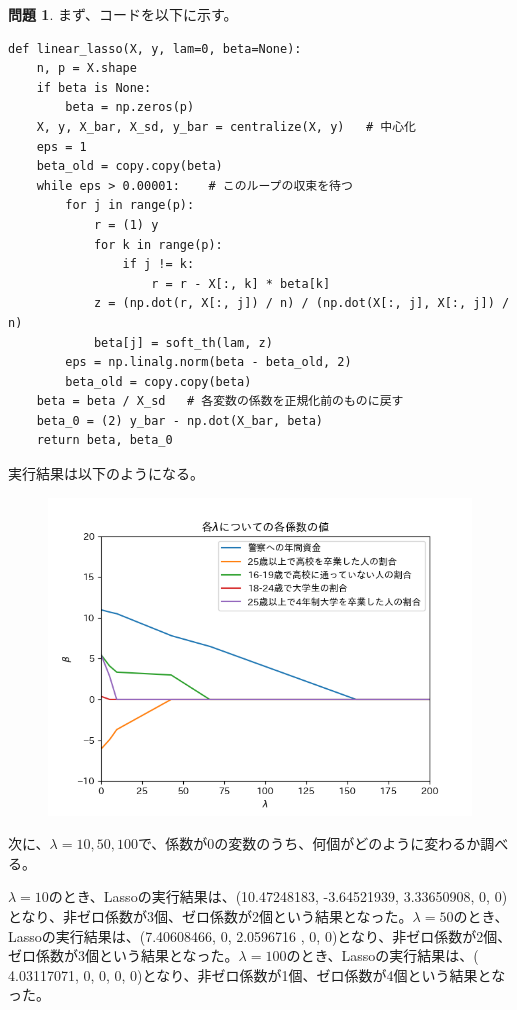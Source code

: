 \documentclass[titlepage]{jsarticle}
\theoremstyle{definition}
\newtheorem{Ex}{問題}
\theoremstyle{mystyle} %
\renewcommand{\footnotesize}{\normalsize}
\begin{document}
\begin{Ex}
まず、コードを以下に示す。
\begin{lstlisting}[basicstyle = \ttfamily\footnotesize, frame = single]
def linear_lasso(X, y, lam=0, beta=None):
    n, p = X.shape
    if beta is None:
        beta = np.zeros(p)
    X, y, X_bar, X_sd, y_bar = centralize(X, y)   # 中心化
    eps = 1
    beta_old = copy.copy(beta)
    while eps > 0.00001:    # このループの収束を待つ
        for j in range(p):
            r = (1) y
            for k in range(p):
                if j != k:
                    r = r - X[:, k] * beta[k]
            z = (np.dot(r, X[:, j]) / n) / (np.dot(X[:, j], X[:, j]) / n)
            beta[j] = soft_th(lam, z)
        eps = np.linalg.norm(beta - beta_old, 2)
        beta_old = copy.copy(beta)
    beta = beta / X_sd   # 各変数の係数を正規化前のものに戻す
    beta_0 = (2) y_bar - np.dot(X_bar, beta)
    return beta, beta_0
\end{lstlisting}

実行結果は以下のようになる。
\begin{figure}[H]
\centering
\includegraphics[scale=0.7] {Lasso1.png}
\end{figure}

次に、$\lambda=10,50,100$で、係数が0の変数のうち、何個がどのように変わるか調べる。


$\lambda=10$のとき、Lassoの実行結果は、(10.47248183, -3.64521939,  3.33650908,  0, 0)となり、非ゼロ係数が3個、ゼロ係数が2個という結果となった。$\lambda=50$のとき、Lassoの実行結果は、(7.40608466, 0,  2.0596716 , 0, 0)となり、非ゼロ係数が2個、ゼロ係数が3個という結果となった。$\lambda=100$のとき、Lassoの実行結果は、( 4.03117071, 0, 0, 0, 0)となり、非ゼロ係数が1個、ゼロ係数が4個という結果となった。
\end{Ex}
\end{document}
